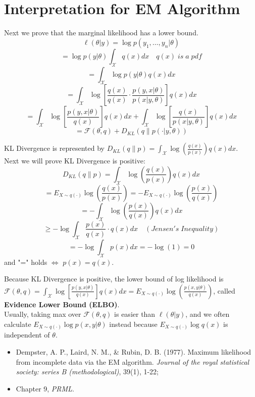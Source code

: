 \documentclass[12pt]{book}
\theoremstyle{definition}
\theoremstyle{remark}
\begin{document}
\newpage
\section{Interpretation for EM Algorithm}
Next we prove that the marginal likelihood has a lower bound.
\[\ell(\theta|y) = \log p(y_1, \dots, y_n|\theta)\]
\[=\log p(y|\theta) \int_\mathcal{X}q(x)dx\quad q(x)\;is\;a\;pdf\]
\[=\int_\mathcal{X}\log p(y|\theta)q(x)dx\]
\[=\int_\mathcal{X}\log[\frac{q(x)}{q(x)}\cdot \frac{p(y,x|\theta)}{p(x|y,\theta)}]q(x)dx\]
\[=\int_\mathcal{X}\log[\frac{p(y,x|\theta)}{q(x)}]q(x)dx+\int_\mathcal{X}\log[\frac{q(x)}{p(x|y,\theta)}]q(x)dx\]
\[ = \mathcal{F}(\theta,q)+D_{KL}(q\|p(\cdot|y,\theta))\]


\begin{notionbox}[KL Divergence]
    KL Divergence is represented by $D_{KL}(q\|p) = \int_\mathcal{X}\log(\frac{q(x)}{p(x)})q(x)dx$. \\
    Next we will prove KL Divergence is positive:
    \[D_{KL}(q\|p) = \int_\mathcal{X}\log(\frac{q(x)}{p(x)})q(x)dx\]
    \[= E_{X\sim q(\cdot)}\log(\frac{q(x)}{p(x)})= -E_{X\sim q(\cdot)}\log(\frac{p(x)}{q(x)})\]
    \[= -\int_\mathcal{X}\log(\frac{p(x)}{q(x)})q(x)dx\]
    \[\ge -\log \int_\mathcal{X}\frac{p(x)}{q(x)}\cdot q(x)dx \quad (Jensen's \; Inequality)\]
    \[ = -\log \int_\mathcal{X}p(x)dx = - \log(1) = 0\]
    and "=" holds $\iff$ $p(x) = q(x)$.
\end{notionbox}

Because KL Divergence is positive, the lower bound of log likelihood is $\mathcal{F}(\theta,q) = \int_\mathcal{X}\log[\frac{p(y,x|\theta)}{q(x)}]q(x)dx = E_{X\sim q(\cdot)}\log(\frac{p(x,y|\theta)}{q(x)})$, called \textbf{Evidence Lower Bound (ELBO)}.\\

Usually, taking max over $\mathcal{F}(\theta,q)$ is easier than $\ell(\theta|y)$, and we often calculate $E_{X\sim q(\cdot)}\log p(x,y|\theta)$ instead because $E_{X\sim q(\cdot)}\log q(x)$ is independent of $\theta$.

\begin{referencebox}
    \begin{itemize}
        \item Dempster, A. P., Laird, N. M., \& Rubin, D. B. (1977). Maximum likelihood from incomplete data via the EM algorithm. \textit{Journal of the royal statistical society: series B (methodological)}, 39(1), 1-22;
        \item Chapter 9, \textit{PRML}.
    \end{itemize}
\end{referencebox}
\end{document}
